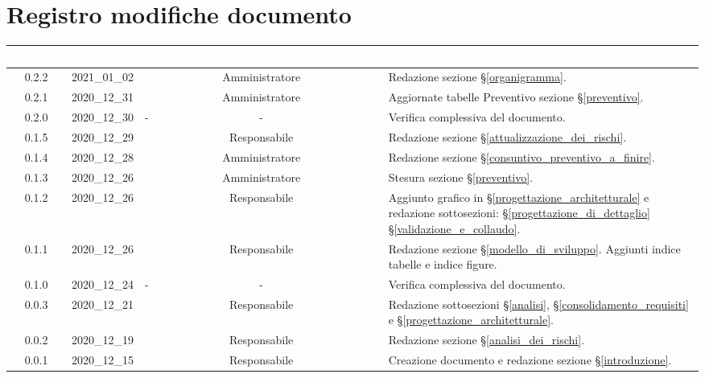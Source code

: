 \section*{Registro modifiche documento}
{

     
\renewcommand{\arraystretch}{1.5}
\centering
\begin{longtable}{c c C{3cm} c c C{3cm}}


 \textcolor{white}{\textbf{Versione}}&
    \textcolor{white}{\textbf{Data}}&
    \textcolor{white}{\textbf{Nominativo}}&
    \textcolor{white}{\textbf{Ruolo}}&
    \textcolor{white}{\textbf{Verificatore}}&
    \textcolor{white}{\textbf{Descrizione}}\\	
    \endhead
    
	  0.2.2 & 2021\_01\_02 & \PC{} & Amministratore & \TG{} & Redazione sezione \S\ref{organigramma}. \\
    
  	0.2.1 & 2020\_12\_31 & \TG{} & Amministratore & \PC{} & Aggiornate tabelle Preventivo sezione \S\ref{preventivo}.\\
 
	  0.2.0 & 2020\_12\_30 &  -  & - &  \TG{} & Verifica complessiva del documento.\\

    0.1.5 & 2020\_12\_29 & \MM{} & Responsabile & \TG{} & Redazione sezione \S\ref{attualizzazione_dei_rischi}. \\

    0.1.4 & 2020\_12\_28 & \PC{} & Amministratore & \TG{} &  Redazione sezione \S\ref{consuntivo_preventivo_a_finire}. \\

    0.1.3 & 2020\_12\_26 & \PC{} & Amministratore & \TG{} & Stesura sezione \S\ref{preventivo}. \\

    0.1.2 & 2020\_12\_26 & \MM{} & Responsabile & \TG{} & Aggiunto grafico in \S\ref{progettazione_architetturale} e redazione sottosezioni:  \S\ref{progettazione_di_dettaglio} \S\ref{validazione_e_collaudo}. \\

    0.1.1 & 2020\_12\_26 & \MM{} & Responsabile & \TG{} & Redazione sezione \S\ref{modello_di_sviluppo}. Aggiunti indice tabelle e indice figure. \\

    0.1.0 & 2020\_12\_24 & - & - & \PC{} & Verifica complessiva del documento.\\

    0.0.3 & 2020\_12\_21 & \MM{} & Responsabile &  \PC{} &Redazione sottosezioni \S\ref{analisi}, \S\ref{consolidamento_requisiti} e \S\ref{progettazione_architetturale}. \\

    0.0.2 & 2020\_12\_19 & \MM{} & Responsabile &  \PC{} & Redazione sezione \S\ref{analisi_dei_rischi}.\\

    0.0.1 & 2020\_12\_15 & \MM{} & Responsabile &  \PC{} & Creazione documento e redazione sezione \S\ref{introduzione}.
			
\end{longtable}
}